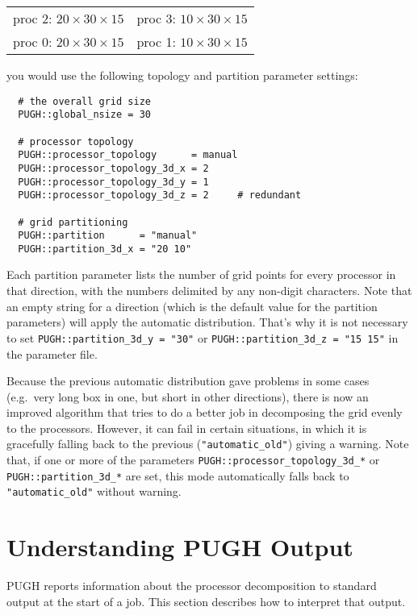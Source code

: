 \documentclass{article}
\begin{document}
\begin{tabular}{cc}
proc 2: $20 \times 30 \times 15$ & proc 3: $10 \times 30 \times 15$ \\
proc 0: $20 \times 30 \times 15$ & proc 1: $10 \times 30 \times 15$ \\
\end{tabular}

you would use the following topology and partition parameter settings:

\begin{verbatim}
  # the overall grid size
  PUGH::global_nsize = 30

  # processor topology
  PUGH::processor_topology      = manual
  PUGH::processor_topology_3d_x = 2
  PUGH::processor_topology_3d_y = 1
  PUGH::processor_topology_3d_z = 2     # redundant

  # grid partitioning
  PUGH::partition      = "manual"
  PUGH::partition_3d_x = "20 10"
\end{verbatim}

Each partition parameter lists the number of grid points for every processor
in that direction, with the numbers delimited by any non-digit characters.
Note that an empty string for a direction (which is the default value for
the partition parameters) will apply the automatic distribution. That's why
it is not necessary to set \verb|PUGH::partition_3d_y = "30"| or
\verb|PUGH::partition_3d_z = "15 15"| in the parameter file.

Because the previous automatic distribution gave problems in some
cases (e.g.\ very long box in one, but short in other directions),
there is now an improved algorithm that tries to do a better job in
decomposing the grid evenly to the processors.  However, it can fail
in certain situations, in which it is gracefully falling back to the
previous (\verb|"automatic_old"|) giving a warning.  Note that, if one
or more of the parameters \verb|PUGH::processor_topology_3d_*| or
\verb|PUGH::partition_3d_*| are set, this mode automatically falls back to
\verb|"automatic_old"| without warning.

\section{Understanding PUGH Output}

\label{pugh_understanding}

PUGH reports information about the processor decomposition to standard output
at the start of a job. This section describes how to interpret that output.
\end{document}
